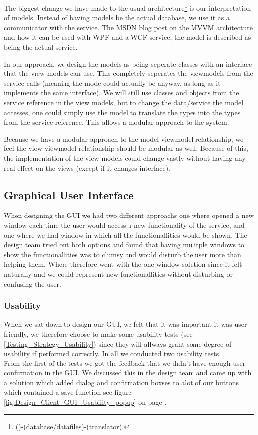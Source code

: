The biggest change we have made to the usual architecture\footnote{()-(database/datafiles)-(translator).} is our interpretation of models. Instead of having models be the actual database, we use it as a communicator with the service. The MSDN blog post on the MVVM architecture \cite{MSDN-WPF-MVVM} and how it can be used with WPF and a WCF service, the model is described as being the actual service. 

In our approach, we design the models as being seperate classes with an interface that the view models can use. This completely seperates the viewmodels from the service calls (meaning the mode could actually be anyway, as long as it implements the same interface). We will still use classes and objects from the service reference in the view models, but to change the data/service the model accesses, one could simply use the model to translate the types into the types from the service reference. This allows a modular approach to the system.

Because we have a modular approach to the model-viewmodel relationship, we feel the view-viewmodel relationship should be modular as well. Because of this, the implementation of the view models could change vastly without having any real effect on the views (except if it changes interface).
\subsection{Graphical User Interface}
\label{Design_Client_GUI}
When designing the GUI we had two different approachs one where opened a new window each time the user would access a new functionality of the service, and one where we had window in which all the functionallities would be shown. The design team tried out both options and found that having mulitple windows to show the functionallities was to clumsy and would disturb the user more than helping them. Where therefore went with the one window solution since it felt naturally and we could represent new functionallities without disturbing or confusing the user.

\subsubsection{Usability}
\label{Design_Client_GUI_Usability}
When we sat down to design our GUI, we felt that it was important it was user friendly, we therefore choose to make some usability tests (see \ref{Testing_Strategy_Usability}) since they will allways grant some degree of usability if performed correctly. In all we conducted two usability tests.
\\From the first of the tests we got the feedback that we didn't have enough user confirmation in the GUI. We discussed this in the design team and came up with a solution which added dialog and confirmation boxses to alot of our buttons which contained a save function see figure \ref{fig:Design_Client_GUI_Usability_popup} on page \pageref{fig:Design_Client_GUI_Usability_popup}.

